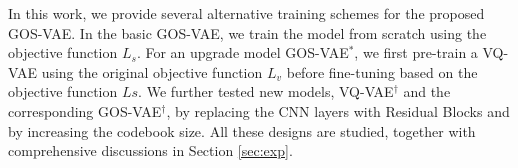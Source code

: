 In this work, we provide several alternative training schemes for the proposed GOS-VAE. In the basic GOS-VAE, we train the model
from scratch using the objective function $L_{s}$. 
For an upgrade model GOS-VAE$^{*}$, we first pre-train a VQ-VAE using the original objective function $L_{v}$ before fine-tuning based on the objective function $L{s}$.
We further tested new models, VQ-VAE$^{\dagger}$ and the corresponding GOS-VAE$^{\dagger}$,  by replacing the CNN layers with Residual Blocks \cite{he2016deep} and by increasing
the codebook size. 
All these designs are studied, together with comprehensive discussions in Section \ref{sec:exp}.

%
